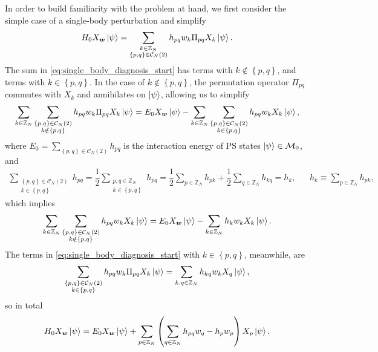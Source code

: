 \documentclass[nofootinbib,notitlepage,11pt]{revtex4-2}
\newcommand{\f}[2]{\dfrac{#1}{#2}} %
\newcommand{\p}[1]{\left(#1\right)} %
\renewcommand{\set}[1]{\left\{#1\right\}} %
\newcommand{\m}{\bm} %
\newcommand{\1}{\mathds{1}}
\newcommand{\C}{\mathcal{C}}
\newcommand{\M}{\mathcal{M}}
\newcommand{\ZZ}{\mathbb{Z}}
\begin{document}
In order to build familiarity with the problem at hand, we first
consider the simple case of a single-body perturbation and simplify
\begin{align}
  H_0 X_{\m w} \ket\psi
  = \sum_{\substack{k\in\ZZ_N\\\set{p,q}\in\C_N\p{2}}}
  h_{pq} w_k \Pi_{pq} X_k \ket\psi.
  \label{eq:single_body_diagnosis_start}
\end{align}
The sum in \eqref{eq:single_body_diagnosis_start} has terms with
$k\notin\set{p,q}$, and terms with $k\in\set{p,q}$.  In the case of
$k\notin\set{p,q}$, the permutation operator $\Pi_{pq}$ commutes with
$X_k$ and annihilates on $\ket\psi$, allowing us to simplify
\begin{align}
  \sum_{k\in\ZZ_N} \sum_{\substack{\set{p,q}\in\C_N\p{2}\\k\notin\set{p,q}}}
  h_{pq} w_k \Pi_{pq} X_k \ket\psi
  = E_0 X_{\m w} \ket\psi
  - \sum_{k\in\ZZ_N} \sum_{\substack{\set{p,q}\in\C_N\p{2}\\k\in\set{p,q}}}
  h_{pq} w_k X_k \ket\psi,
\end{align}
where $E_0 = \sum_{\set{p,q}\in\C_N\p{2}} h_{pq}$ is the interaction
energy of PS states $\ket\psi\in\M_0$, and
\begin{align}
  \sum_{\substack{\set{p,q}\in\C_N\p{2}\\k\in\set{p,q}}} h_{pq}
  = \f12 \sum_{\substack{p,q\in\ZZ_N\\k\in\set{p,q}}} h_{pq}
  = \f12 \sum_{p\in\ZZ_N} h_{pk} + \f12 \sum_{q\in\ZZ_N} h_{kq}
  = h_k,
  &&
  h_k \equiv \sum_{p\in\ZZ_N} h_{pk},
\end{align}
which implies
\begin{align}
  \sum_{k\in\ZZ_N} \sum_{\substack{\set{p,q}\in\C_N\p{2}\\k\notin\set{p,q}}}
  h_{pq} w_k X_k \ket\psi
  = E_0 X_{\m w} \ket\psi
  - \sum_{k\in\ZZ_N} h_k w_k X_k \ket\psi.
\end{align}
The terms in \eqref{eq:single_body_diagnosis_start} with
$k\in\set{p,q}$, meanwhile, are
\begin{align}
  \sum_{\substack{\set{p,q}\in\C_N\p{2}\\k\in\set{p,q}}}
  h_{pq} w_k \Pi_{pq} X_k \ket\psi
  = \sum_{k,q\in\ZZ_N} h_{kq} w_k X_q \ket\psi,
\end{align}
so in total
\begin{align}
  H_0 X_{\m w} \ket\psi
  = E_0 X_{\m w} \ket\psi
  + \sum_{p\in\ZZ_N} \p{\sum_{q\in\ZZ_N} h_{pq} w_q - h_p w_p}
  X_p \ket\psi.
  \label{eq:single_body_diagnosis_end}
\end{align}
\end{document}
